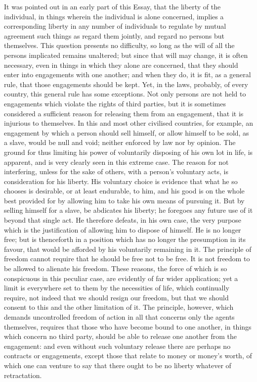 \documentclass[11pt,openany]{book}
\begin{document}
It was pointed out in an early part of this Essay, that the liberty of the individual, in things wherein the individual is alone concerned, implies a corresponding liberty in any number of individuals to regulate by mutual agreement such things as regard them jointly, and regard no persons but themselves. This question presents no difficulty, so long as the will of all the persons implicated remains unaltered; but since that will may change, it is often necessary, even in things in which they alone are concerned, that they should enter into engagements with one another; and when they do, it is fit, as a general rule, that those engagements should be kept. Yet, in the laws, probably, of every country, this general rule has some exceptions. Not only persons are not held to engagements which violate the rights of third parties, but it is sometimes considered a sufficient reason for releasing them from an engagement, that it is injurious to themselves. In this and most other civilised countries, for example, an engagement by which a person should sell himself, or allow himself to be sold, as a slave, would be null and void; neither enforced by law nor by opinion. The ground for thus limiting his power of voluntarily disposing of his own lot in life, is apparent, and is very clearly seen in this extreme case. The reason for not interfering, unless for the sake of others, with a person's voluntary acts, is consideration for his liberty. His voluntary choice is evidence that what he so chooses is desirable, or at least endurable, to him, and his good is on the whole best provided for by allowing him to take his own means of pursuing it. But by selling himself for a slave, be abdicates his liberty; he foregoes any future use of it beyond that single act. He therefore defeats, in his own case, the very purpose which is the justification of allowing him to dispose of himself. He is no longer free; but is thenceforth in a position which has no longer the presumption in its favour, that would be afforded by his voluntarily remaining in it. The principle of freedom cannot require that he should be free not to be free. It is not freedom to be allowed to alienate his freedom. These reasons, the force of which is so conspicuous in this peculiar case, are evidently of far wider application; yet a limit is everywhere set to them by the necessities of life, which continually require, not indeed that we should resign our freedom, but that we should consent to this and the other limitation of it. The principle, however, which demands uncontrolled freedom of action in all that concerns only the agents themselves, requires that those who have become bound to one another, in things which concern no third party, should be able to release one another from the engagement: and even without such voluntary release there are perhaps no contracts or engagements, except those that relate to money or money's worth, of which one can venture to say that there ought to be no liberty whatever of retractation.
\end{document}
